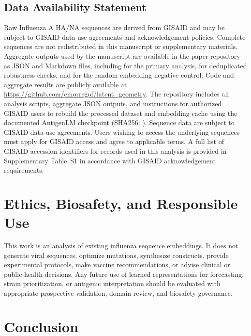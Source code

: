 \documentclass[11pt]{article}
\begin{document}
\subsection*{Data Availability Statement}

Raw Influenza A HA/NA sequences are derived from GISAID \cite{shu2017gisaid} and may be subject to GISAID data-use agreements and acknowledgement policies. Complete sequences are not redistributed in this manuscript or supplementary materials. Aggregate outputs used by the manuscript are available in the paper repository as JSON and Markdown files, including  for the primary analysis,  for deduplicated robustness checks, and  for the random embedding negative control. Code and aggregate results are publicly available at \url{https://github.com/cmorregof/latent_geometry}. The repository includes all analysis scripts, aggregate JSON outputs, and instructions for authorized GISAID users to rebuild the processed dataset and embedding cache using the documented AntigenLM checkpoint (SHA256: ). Sequence data are subject to GISAID data-use agreements. Users wishing to access the underlying sequences must apply for GISAID access and agree to applicable terms. A full list of GISAID accession identifiers for records used in this analysis is provided in Supplementary Table~S1 in accordance with GISAID acknowledgement requirements.

\section{Ethics, Biosafety, and Responsible Use}

This work is an analysis of existing influenza sequence embeddings. It does not generate viral sequences, optimize mutations, synthesize constructs, provide experimental protocols, make vaccine recommendations, or advise clinical or public-health decisions. Any future use of learned representations for forecasting, strain prioritization, or antigenic interpretation should be evaluated with appropriate prospective validation, domain review, and biosafety governance.

\section{Conclusion}
\end{document}
